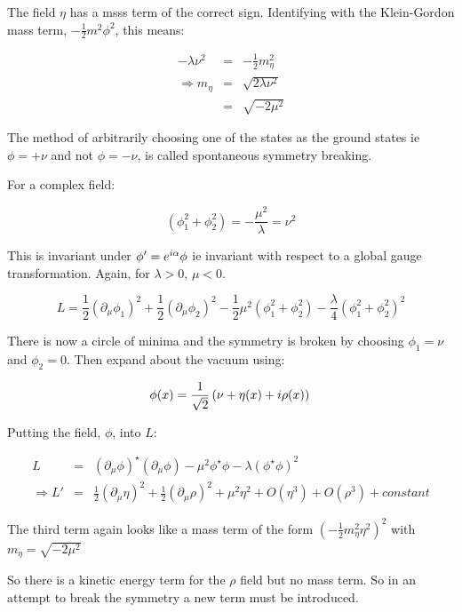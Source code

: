 The field $\eta$ has a msss term of the correct sign.  Identifying with the Klein-Gordon mass term, $-\frac{1}{2}m^2\phi^2$, this means:

\begin{eqnarray*}
  -\lambda\nu^2 & = & -\frac{1}{2}m_{\eta}^2 \\
  \Rightarrow m_{\eta} & = & \sqrt{2\lambda\nu^2} \\
  & = & \sqrt{-2\mu^2}
\end{eqnarray*}

The method of arbitrarily choosing one of the states as the ground states ie $\phi = +\nu $ and not $\phi = -\nu$, is called spontaneous symmetry breaking.

For a complex field:

\[
  \left(\phi_1^2 + \phi_2^2\right) = -\frac{\mu^2}{\lambda} = \nu^2
\]

This is invariant under $\phi' = e^{i\alpha}\phi$ ie invariant with respect to a global gauge transformation.  Again, for $\lambda>0$, $\mu<0$.

\[
  L = \frac{1}{2}\left(\partial_{\mu}\phi_1\right)^2 + \frac{1}{2}\left(\partial_{\mu}\phi_2\right)^2 -\frac{1}{2}\mu^2\left(\phi_1^2 + \phi_2^2\right) - \frac{\lambda}{4}\left(\phi_1^2 + \phi_2^2\right)^2
\]

There is now a circle of minima and the symmetry is broken by choosing $\phi_1 = \nu$ and $\phi_2 = 0$.  Then expand about the vacuum using:

\[
  \phi(x) = \frac{1}{\sqrt{2}}\left(\nu + \eta(x) + i\rho(x)\right) \\
\]

Putting the field, $\phi$, into $L$:

\begin{eqnarray*}
  L & = & \left(\partial_{\mu}\phi\right)^{\star}\left(\partial_{\mu}\phi\right) - \mu^2\phi^{\star}\phi - \lambda\left(\phi^{\star}\phi\right)^2 \\
  \Rightarrow L' & = & \frac{1}{2}\left(\partial_{\mu}\eta\right)^2 + \frac{1}{2}\left(\partial_{\mu}\rho\right)^2 + \mu^2\eta^2 + O(\eta^3) + O(\rho^3) + constant
\end{eqnarray*}

The third term again looks like a mass term of the form $\left(-\frac{1}{2}m_{\eta}^2\eta^2\right)^2$ with $m_{\eta} = \sqrt{-2\mu^2}$

So there is a kinetic energy term for the $\rho$ field but no mass term.  So in an attempt to break the symmetry a new term must be introduced.


